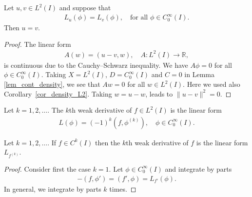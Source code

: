\documentclass[12pt,oneside,final]{amsart}
\def\R{\mathbb R}
\begin{document}
\begin{lemma}
Let $u, v \in L^2(I)$ and suppose that 
    \begin{align*}
L_u(\phi) = L_v(\phi), \quad \text{for all $\phi \in C_0^\infty(I)$}.
    \end{align*}
Then $u = v$.
\end{lemma}
\begin{proof}
The linear form 
    \begin{align*}
A(w) = (u - v, w), \quad A : L^2(I) \to \R,
    \end{align*}
is continuous due to the Cauchy--Schwarz inequality.
We have $A \phi = 0$ for all $\phi \in C_0^\infty(I)$.
Taking $X=L^2(I)$, $D=C_0^\infty(I)$ and $C=0$ in Lemma \ref{lem_cont_density}, we see that $Aw = 0$ for all $w \in L^2(I)$.
Here we used also Corollary~\ref{cor_density_L2}.
Taking $w = u-w$, leads to $\|u-v\|^2 = 0$.
\end{proof}

\begin{definition}
Let $k=1,2,\dots$.
The $k$th weak derivative of $f \in L^2(I)$ is the linear form
    \begin{align*}
L(\phi) = (-1)^k (f, \phi^{(k)}), \quad \phi \in C_0^\infty(I).
    \end{align*}
\end{definition}

\begin{lemma}\label{lem_weak_classic}
Let $k=1,2,\dots$.
If $f \in C^k(I)$ then the $k$th weak derivative of $f$ is the linear form $L_{f^{(k)}}$.
\end{lemma}
\begin{proof}
Consider first the case $k=1$.
Let $\phi \in C_0^\infty(I)$ and integrate by parts
    \begin{align*}
-(f, \phi') = (f', \phi) = L_{f'}(\phi).
    \end{align*}
In general, we integrate by parts $k$ times. 
\end{proof}
\end{document}
